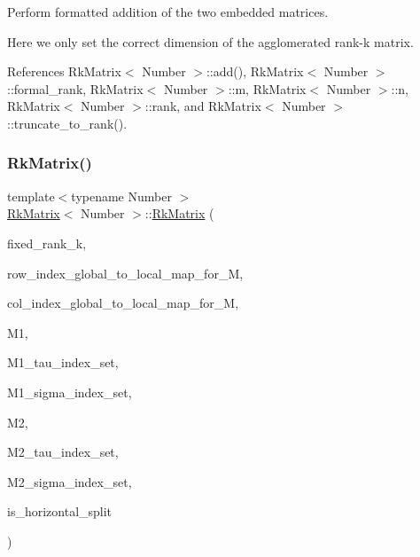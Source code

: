 Perform formatted addition of the two embedded matrices.

Here we only set the correct dimension of the agglomerated rank-\/k matrix.

References Rk\+Matrix$<$ Number $>$\+::add(), Rk\+Matrix$<$ Number $>$\+::formal\+\_\+rank, Rk\+Matrix$<$ Number $>$\+::m, Rk\+Matrix$<$ Number $>$\+::n, Rk\+Matrix$<$ Number $>$\+::rank, and Rk\+Matrix$<$ Number $>$\+::truncate\+\_\+to\+\_\+rank().

\mbox{\label{classRkMatrix_a0ef50f2d8d07bcbffa0a6d015dc0d1a4}} 
\subsubsection{\texorpdfstring{Rk\+Matrix()}{RkMatrix()}\hspace{0.1cm}{\footnotesize\ttfamily [15/18]}}
{\footnotesize\ttfamily template$<$typename Number $>$ \\
\hyperlink{classRkMatrix}{Rk\+Matrix}$<$ Number $>$\+::\hyperlink{classRkMatrix}{Rk\+Matrix} (\begin{DoxyParamCaption}\item[{const \hyperlink{classRkMatrix_add060bfc3a4cc77f858c3d6dd58cadd5}{size\+\_\+type}}]{fixed\+\_\+rank\+\_\+k,  }\item[{const std\+::map$<$ types\+::global\+\_\+dof\+\_\+index, size\+\_\+t $>$ \&}]{row\+\_\+index\+\_\+global\+\_\+to\+\_\+local\+\_\+map\+\_\+for\+\_\+M,  }\item[{const std\+::map$<$ types\+::global\+\_\+dof\+\_\+index, size\+\_\+t $>$ \&}]{col\+\_\+index\+\_\+global\+\_\+to\+\_\+local\+\_\+map\+\_\+for\+\_\+M,  }\item[{const \hyperlink{classRkMatrix}{Rk\+Matrix}$<$ Number $>$ \&}]{M1,  }\item[{const std\+::vector$<$ types\+::global\+\_\+dof\+\_\+index $>$ \&}]{M1\+\_\+tau\+\_\+index\+\_\+set,  }\item[{const std\+::vector$<$ types\+::global\+\_\+dof\+\_\+index $>$ \&}]{M1\+\_\+sigma\+\_\+index\+\_\+set,  }\item[{const \hyperlink{classRkMatrix}{Rk\+Matrix}$<$ Number $>$ \&}]{M2,  }\item[{const std\+::vector$<$ types\+::global\+\_\+dof\+\_\+index $>$ \&}]{M2\+\_\+tau\+\_\+index\+\_\+set,  }\item[{const std\+::vector$<$ types\+::global\+\_\+dof\+\_\+index $>$ \&}]{M2\+\_\+sigma\+\_\+index\+\_\+set,  }\item[{bool}]{is\+\_\+horizontal\+\_\+split }\end{DoxyParamCaption})}

